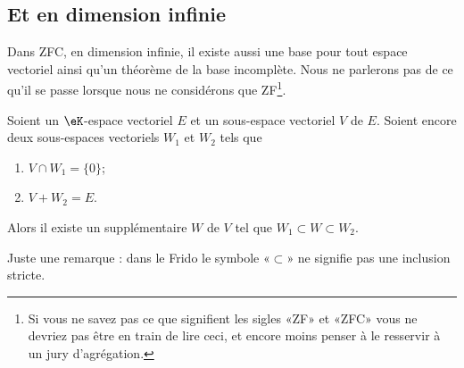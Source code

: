 \subsection{Et en dimension infinie}

Dans ZFC, en dimension infinie, il existe aussi une base pour tout espace vectoriel ainsi qu'un théorème de la base incomplète. Nous ne parlerons pas de ce qu'il se passe lorsque nous ne considérons que ZF\footnote{Si vous ne savez pas ce que signifient les sigles «ZF» et «ZFC» vous ne devriez pas être en train de lire ceci, et encore moins penser à le resservir à un jury d'agrégation.}.

\begin{lemma}        \label{LEMooSSRXooIyfgNz}
	Soient un \( \eK\)-espace vectoriel \( E\) et un sous-espace vectoriel \( V\) de \( E\). Soient encore deux sous-espaces vectoriels \( W_1\) et \( W_2\) tels que
	\begin{enumerate}
		\item
		      \( V\cap W_1=\{ 0 \}\);
		\item
		      \( V+W_2=E\).
	\end{enumerate}
	Alors il existe un supplémentaire \( W\) de \( V\) tel que \( W_1\subset W\subset W_2\).
\end{lemma}

Juste une remarque : dans le Frido le symbole «\( \subset\)» ne signifie pas une inclusion stricte.

